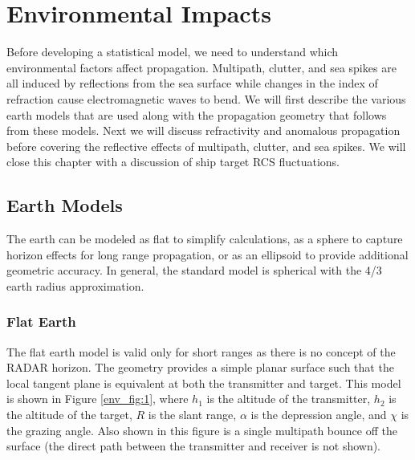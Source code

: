 \renewcommand{\baselinestretch}{2} \small\normalsize
\chapter{Environmental Impacts}\label{chapter_env}
Before developing a statistical model, we need to understand which environmental factors affect propagation. Multipath, clutter, and sea spikes are all induced by reflections from the sea surface while changes in the index of refraction cause electromagnetic waves to bend. We will first describe the various earth models that are used along with the propagation geometry that follows from these models. Next we will discuss refractivity and anomalous propagation before covering the reflective effects of multipath, clutter, and sea spikes. We will close this chapter with a discussion of ship target RCS fluctuations.

\section{Earth Models}
The earth can be modeled as flat to simplify calculations, as a sphere to capture horizon effects for long range propagation, or as an ellipsoid to provide additional geometric accuracy. In general, the standard model is spherical with the 4/3 earth radius approximation.

\subsection{Flat Earth}
The flat earth model is valid only for short ranges as there is no concept of the RADAR horizon. The geometry provides a simple planar surface such that the local tangent plane is equivalent at both the transmitter and target. This model is shown in Figure \ref{env_fig:1}, where $h_1$ is the altitude of the transmitter, $h_2$ is the altitude of the target, $R$ is the slant range, $\alpha$ is the depression angle, and $\chi$ is the grazing angle. Also shown in this figure is a single multipath bounce off the surface (the direct path between the transmitter and receiver is not shown). 

